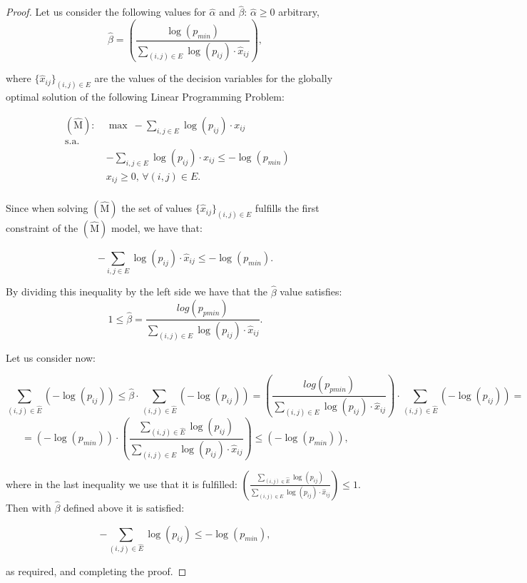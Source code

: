 \begin{proof} Let us consider the following values for $\hat{\alpha}$
and $\hat{\beta}$: $\hat{\alpha}\geq 0$ arbitrary,
\[\hat{\beta}=\left(\frac{\log(p_{min})}{\sum_{(i,j)\in E} \log(p_{ij})\cdot
\hat{x}_{ij}}\right) ,\]

where $\{\hat{x}_{ij}\}_{(i,j)\in E}$ are the values of the
decision variables for the globally optimal solution of the
following Linear Programming Problem:

\begin{align}
  (\mathrm{\hat{M}}):~ & \max~ -\sum_{i,j\in E} \log(p_{ij})\cdot x_{ij} \nonumber\\
 \mathrm{s.a.} & \nonumber\\
   & -\sum_{i,j\in E} \log(p_{ij})\cdot x_{ij}\leq -\log(p_{min})  & \nonumber &\\
   &                 x_{ij}\geq 0,\, \forall (i,j)\in E.   & \nonumber &
\end{align}  ~\\

Since when solving $(\mathrm{\hat{M}})$ the set of values
$\{\hat{x}_{ij}\}_{(i,j)\in E}$ fulfills the first constraint of
the $(\mathrm{\hat{M}})$ model, we have that:

\[-\sum_{i,j\in E} \log(p_{ij})\cdot \hat{x}_{ij}\leq -\log(p_{min}). \]

By dividing this inequality by the left side we have that the
$\hat{\beta}$ value satisfies:\\

\[1 \leq \hat{\beta}=\frac{log(p_{pmin})}{\sum_{(i,j)\in E} \log(p_{ij})\cdot
\hat{x}_{ij}}. \]

Let us consider now:

\[\sum_{(i,j)\in \hat{E}} (-\log(p_{ij}))\leq \hat{\beta}\cdot \sum_{(i,j)\in \hat{E}} (-\log(p_{ij}))=\left(\frac{log(p_{pmin})}{\sum_{(i,j)\in E} \log(p_{ij})\cdot
\hat{x}_{ij}}\right)\cdot \sum_{(i,j)\in \hat{E}} (-\log(p_{ij}))=
\]
\[=(-\log(p_{min}))\cdot \left(\frac{\sum_{(i,j)\in \hat{E}} \log(p_{ij})}{\sum_{(i,j)\in E} \log(p_{ij})\cdot
\hat{x}_{ij}}\right)\leq (-\log(p_{min})),
\]

where in the last inequality we use that it is fulfilled:
$\left(\frac{\sum_{(i,j)\in \hat{E}} \log(p_{ij})}{\sum_{(i,j)\in
E} \log(p_{ij})\cdot
\hat{x}_{ij}}\right)\leq 1$.\\

Then with $\hat{\beta}$ defined above it is satisfied:

\[-\sum_{(i,j)\in \hat{E}} \log(p_{ij})\leq -\log(p_{min}), \]

as required, and completing the proof.
\end{proof}

